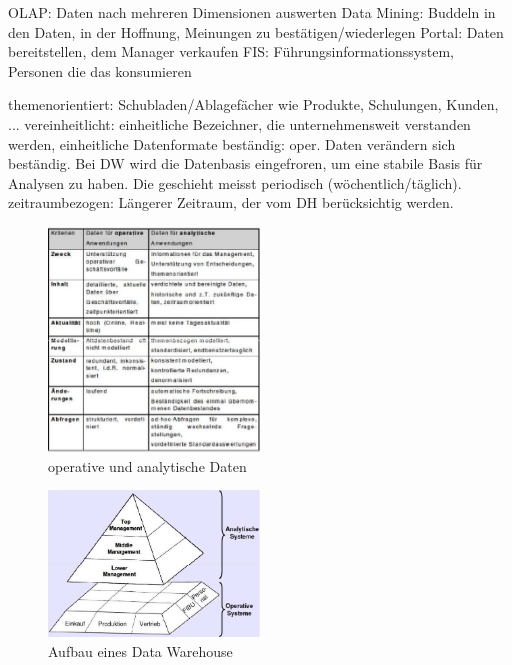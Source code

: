 \documentclass[ngerman,a4paper,12pt]{scrreprt}
\begin{document}
\ul
	\li OLAP: Daten nach mehreren Dimensionen auswerten
	\li Data Mining: Buddeln in den Daten, in der Hoffnung, Meinungen zu bestätigen/wiederlegen
	\li Portal: Daten bereitstellen, dem Manager verkaufen
	\li FIS: Führungsinformationssystem, Personen die das konsumieren
\ulE


\ul
	\li themenorientiert: Schubladen/Ablagefächer wie Produkte, Schulungen, Kunden, ...
	\li vereinheitlicht: einheitliche Bezeichner, die unternehmensweit verstanden werden, einheitliche Datenformate
	\li beständig: oper. Daten verändern sich beständig. Bei DW wird die Datenbasis eingefroren, um eine stabile Basis für Analysen zu haben. Die geschieht meisst periodisch (wöchentlich/täglich).
	\li zeitraumbezogen: Längerer Zeitraum, der vom DH berücksichtig werden.
\ulE

\begin{figure}[H]
	\centering
	\includegraphics[width=0.5\textwidth]{img/V6.3.jpg}
	\caption{operative und analytische Daten}
	\label{}
\end{figure}

\begin{figure}[H]
	\centering
	\includegraphics[width=0.5\textwidth]{img/V6.1.jpg}
	\caption{Aufbau eines Data Warehouse}
	\label{}
\end{figure}
\end{document}
